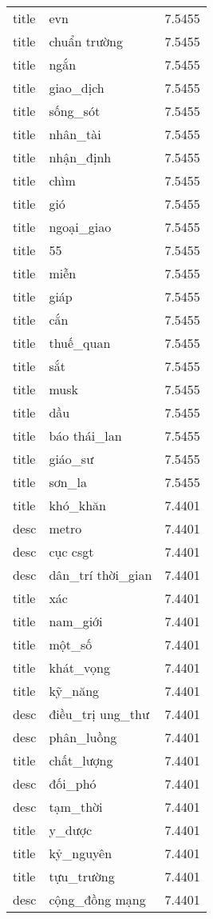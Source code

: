 \documentclass{article}
\begin{document}
\begin{tabular}{lll}
title & evn & 7.5455\\
title & chuẩn trường & 7.5455\\
title & ngắn & 7.5455\\
title & giao\_dịch & 7.5455\\
title & sống\_sót & 7.5455\\
title & nhân\_tài & 7.5455\\
title & nhận\_định & 7.5455\\
title & chìm & 7.5455\\
title & gió & 7.5455\\
title & ngoại\_giao & 7.5455\\
title & 55 & 7.5455\\
title & miễn & 7.5455\\
title & giáp & 7.5455\\
title & cắn & 7.5455\\
title & thuế\_quan & 7.5455\\
title & sắt & 7.5455\\
title & musk & 7.5455\\
title & dầu & 7.5455\\
title & báo thái\_lan & 7.5455\\
title & giáo\_sư & 7.5455\\
title & sơn\_la & 7.5455\\
title & khó\_khăn & 7.4401\\
desc & metro & 7.4401\\
desc & cục csgt & 7.4401\\
desc & dân\_trí thời\_gian & 7.4401\\
title & xác & 7.4401\\
title & nam\_giới & 7.4401\\
title & một\_số & 7.4401\\
title & khát\_vọng & 7.4401\\
title & kỹ\_năng & 7.4401\\
desc & điều\_trị ung\_thư & 7.4401\\
desc & phân\_luồng & 7.4401\\
title & chất\_lượng & 7.4401\\
desc & đối\_phó & 7.4401\\
desc & tạm\_thời & 7.4401\\
title & y\_dược & 7.4401\\
title & kỷ\_nguyên & 7.4401\\
title & tựu\_trường & 7.4401\\
desc & cộng\_đồng mạng & 7.4401\\

\end{tabular}
\end{document}
